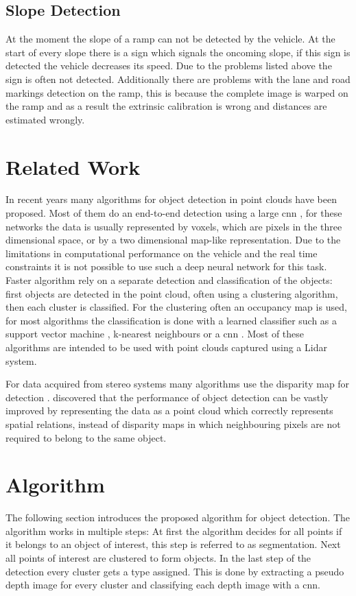 \subsection{Slope Detection}
At the moment the slope of a ramp can not be detected by the vehicle. 
At the start of every slope there is a sign which signals the oncoming slope, if this sign is detected the vehicle decreases its speed.
Due to the problems listed above the sign is often not detected. Additionally there are problems with the lane and road markings detection on the ramp, this is because the complete image is warped on the ramp and as a result the extrinsic calibration is wrong and distances are estimated wrongly.

\section{Related Work}
In recent years many algorithms for object detection in point clouds have been proposed. 
Most of them do an end-to-end detection using a large \ac{cnn} \cite{Yin17} \cite{Bin19} \cite{Mar18} \cite{Li16}, for these networks the data is usually represented by voxels, which are pixels in the three dimensional space, or by a two dimensional map-like representation.
Due to the limitations in computational performance on the vehicle and the real time constraints it is not possible to use such a deep neural network for this task.
Faster algorithm rely on a separate detection and classification of the objects: first objects are detected in the point cloud, often using a clustering algorithm, then each cluster is classified.
For the clustering often an occupancy map is used, for most algorithms the classification is done with a learned classifier such as a support vector machine \cite{HivHWu10}, k-nearest neighbours \cite{YifeiTian18} or a \ac{cnn} \cite{AttBen17}.
Most of these algorithms are intended to be used with point clouds captured using a Lidar system.

For data acquired from stereo systems many algorithms use the disparity map for detection \cite{guindel18} \cite{qian16}. 
\cite{Wang19} discovered that the performance of object detection can be vastly improved by representing the data as a point cloud which correctly represents spatial relations, instead of disparity maps in which neighbouring pixels are not required to belong to the same object.

\section{Algorithm}
The following section introduces the proposed algorithm for object detection. 
The algorithm works in multiple steps: At first the algorithm decides for all points if it belongs to an object of interest, this step is referred to as segmentation. Next all points of interest are clustered to form objects. In the last step of the detection every cluster gets a type assigned. This is done by extracting a pseudo depth image for every cluster and classifying each depth image with a \ac{cnn}.


